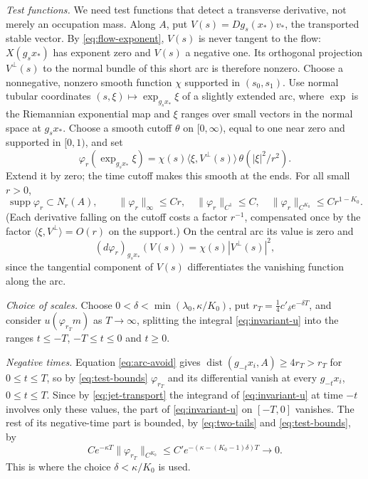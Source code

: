 \documentclass[12pt]{article}
\theoremstyle{remark}
\newcommand{\dist}{\operatorname{dist}}
\newcommand{\supp}{\operatorname{supp}}
\begin{document}
\emph{Test functions.}
We need test functions that detect a transverse derivative, not
merely an occupation mass.
Along \(A\), put \(V(s)=Dg_s(x_*)v_*\), the transported stable vector.
By \eqref{eq:flow-exponent}, \(V(s)\) is never tangent to the flow:
\(X(g_sx_*)\) has exponent zero and \(V(s)\) a negative one.
Its orthogonal projection \(V^\perp(s)\) to the normal bundle of
this short arc is therefore nonzero.
Choose a nonnegative, nonzero smooth function
\(\chi\) supported in \((s_0,s_1)\).
Use normal tubular coordinates \((s,\xi)\mapsto\exp_{g_sx_*}\xi\) of a
slightly extended arc, where \(\exp\) is the Riemannian exponential
map and \(\xi\) ranges over small vectors in the normal space at
\(g_sx_*\).  Choose a smooth cutoff \(\theta\) on \([0,\infty)\),
equal to one near zero and supported in \([0,1)\), and set
\begin{equation}\label{eq:arc-test}
 \varphi_r(\exp_{g_sx_*}\xi)=
    \chi(s)\langle \xi,V^\perp(s)\rangle\,
                     \theta(|\xi|^2/r^2).
\end{equation}
Extend it by zero; the time cutoff makes this smooth at the ends.
For all small \(r>0\),
\begin{equation}\label{eq:test-bounds}
 \supp\varphi_r\subset N_r(A),\qquad
 \|\varphi_r\|_\infty\le Cr,\quad
 \|\varphi_r\|_{C^1}\le C,\quad
 \|\varphi_r\|_{C^{K_0}}\le Cr^{1-K_0}.
\end{equation}
(Each derivative falling on the cutoff costs a factor \(r^{-1}\),
compensated once by the factor \(\langle \xi,V^\perp\rangle=O(r)\) on
the support.)
On the central arc its value is zero and
\begin{equation}\label{eq:test-gradient}
 (d\varphi_r)_{g_sx_*}(V(s))
                      =\chi(s)|V^\perp(s)|^2,
\end{equation}
since the tangential component of \(V(s)\) differentiates the
vanishing function along the arc.

\emph{Choice of scales.}
Choose \(0<\delta<\min(\lambda_0,\kappa/K_0)\), put
\(r_T=\tfrac14c'_\delta e^{-\delta T}\),
and consider \(u(\varphi_{r_T}m)\) as \(T\to\infty\), splitting the
integral \eqref{eq:invariant-u} into the ranges \(t\le-T\),
\(-T\le t\le0\) and \(t\ge0\).

\emph{Negative times.}
Equation \eqref{eq:arc-avoid} gives
\(\dist(g_{-t}x_i,A)\ge4r_{T}>r_T\) for \(0\le t\le T\), so by
\eqref{eq:test-bounds} \(\varphi_{r_T}\) and its differential vanish
at every \(g_{-t}x_i\), \(0\le t\le T\).  Since by
\eqref{eq:jet-transport} the integrand of \eqref{eq:invariant-u} at
time \(-t\) involves only these values, the part of
\eqref{eq:invariant-u} on \([-T,0]\) vanishes.
The rest of its negative-time part is bounded, by \eqref{eq:two-tails}
and \eqref{eq:test-bounds}, by
\[
 C e^{-\kappa T}\|\varphi_{r_T}\|_{C^{K_0}}
 \le C'e^{-(\kappa-(K_0-1)\delta)T}\longrightarrow0.
\]
This is where the choice \(\delta<\kappa/K_0\) is used.
\end{document}
